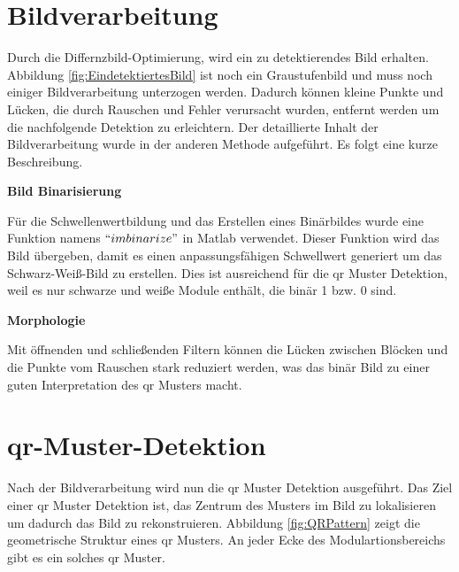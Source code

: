 \section{Bildverarbeitung} 
Durch die Differnzbild-Optimierung, wird ein zu detektierendes Bild erhalten. Abbildung \ref{fig:EindetektiertesBild} ist noch ein Graustufenbild und muss noch einiger Bildverarbeitung unterzogen werden. Dadurch können kleine Punkte und Lücken, die durch Rauschen und Fehler verursacht wurden, entfernt werden um die nachfolgende Detektion zu erleichtern. Der detaillierte Inhalt der Bildverarbeitung wurde in der anderen Methode aufgeführt. Es folgt eine kurze Beschreibung. 

\textbf{Bild Binarisierung}

Für die Schwellenwertbildung und das Erstellen eines Binärbildes wurde eine Funktion namens $ ``imbinarize" $ in Matlab verwendet. Dieser Funktion wird das Bild übergeben, damit es einen anpassungsfähigen Schwellwert generiert um das Schwarz-Weiß-Bild zu erstellen. Dies ist ausreichend für die \gls{qr} Muster Detektion, weil es nur schwarze und weiße Module enthält, die binär 1 bzw. 0 sind. 



\textbf{Morphologie}

Mit öffnenden und schließenden Filtern können die Lücken zwischen Blöcken und die Punkte vom Rauschen stark reduziert werden, was das binär Bild zu einer guten Interpretation des \gls{qr} Musters macht. 

\section{\gls{qr}-Muster-Detektion} 

Nach der Bildverarbeitung wird nun die \gls{qr} Muster Detektion ausgeführt. Das Ziel einer \gls{qr} Muster Detektion \cite{QR} ist, das Zentrum des Musters im Bild zu lokalisieren um dadurch das Bild zu rekonstruieren. Abbildung \ref{fig:QRPattern} zeigt die geometrische Struktur eines \gls{qr} Musters. An jeder Ecke des Modulartionsbereichs gibt es ein solches \gls{qr} Muster.

